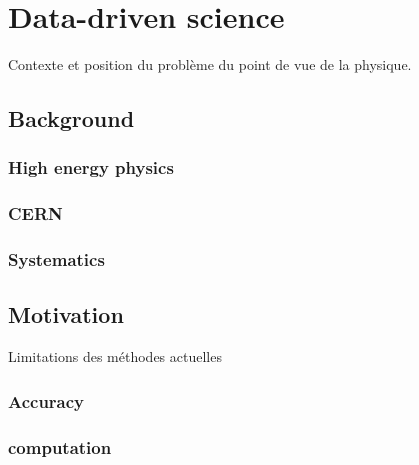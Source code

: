 
\chapter{Data-driven science}  %
\label{chap:intro_phy}
\ifpdf
    \graphicspath{{Chapter1/Figs/Raster/}{Chapter1/Figs/PDF/}{Chapter1/Figs/}}
\else
    \graphicspath{{Chapter1/Figs/Vector/}{Chapter1/Figs/}}
\fi

Contexte et position du problème du point de vue de la physique.

\section{Background}


\subsection{High energy physics} %
\label{sub:high_energy_physics}

\subsection{CERN} %
\label{sub:cern}


\subsection{Systematics} %
\label{sub:systematics}

\section{Motivation} %
\label{sec:motivation}

Limitations des méthodes actuelles

\subsection{Accuracy} %
\label{sub:accuracy}


\subsection{computation} %
\label{sub:computation}

